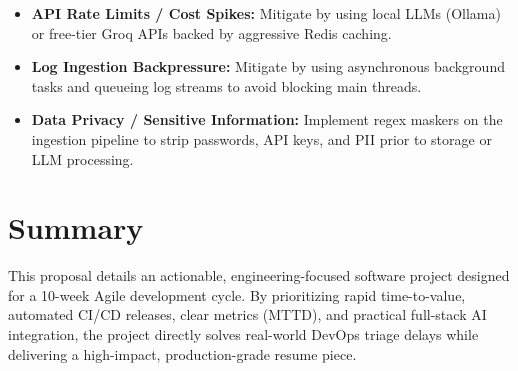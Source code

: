 \documentclass[11pt,a4paper]{article}
\begin{document}
\begin{itemize}[leftmargin=0.7cm]

\item \textbf{API Rate Limits / Cost Spikes:} Mitigate by using local LLMs (Ollama) or free-tier Groq APIs backed by aggressive Redis caching.

\item \textbf{Log Ingestion Backpressure:} Mitigate by using asynchronous background tasks and queueing log streams to avoid blocking main threads.

\item \textbf{Data Privacy / Sensitive Information:} Implement regex maskers on the ingestion pipeline to strip passwords, API keys, and PII prior to storage or LLM processing.

\end{itemize}


\section{Summary}

This proposal details an actionable, engineering-focused software project designed for a 10-week Agile development cycle. By prioritizing rapid time-to-value, automated CI/CD releases, clear metrics (MTTD), and practical full-stack AI integration, the project directly solves real-world DevOps triage delays while delivering a high-impact, production-grade resume piece.

\end{document}
